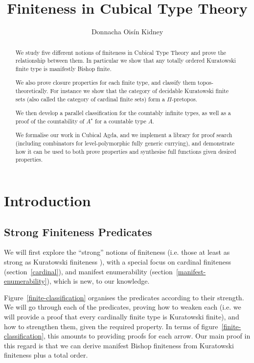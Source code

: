 
\title{Finiteness in Cubical Type Theory}
\author{Donnacha Oisín Kidney}

\maketitle
\begin{abstract}
  We study five different notions of finiteness in Cubical Type Theory and prove
  the relationship between them.
  In particular we show that any totally ordered Kuratowski finite type is
  manifestly Bishop finite.

  We also prove closure properties for each finite type, and classify them
  topos-theoretically.
  For instance we show that the category of decidable Kuratowski finite sets
  (also called the category of cardinal finite sets) form a \(\Pi\)-pretopos.

  We then develop a parallel classification for the countably infinite types, as
  well as a proof of the countability of \(A^\star\) for a countable type \(A\).

  We formalise our work in Cubical Agda, and we implement a library for proof
  search (including combinators for level-polymorphic fully generic currying),
  and demonstrate how it can be used to both prove properties and synthesise
  full functions given desired properties.
\end{abstract}
\section{Introduction}
\subsection{Strong Finiteness Predicates}

We will first explore the ``strong'' notions of finiteness (i.e. those at least
as strong as Kuratowski finiteness \cite{kuratowskiNotionEnsembleFini1920}),
with a special focus on cardinal finiteness (section~\ref{cardinal}), and
manifest enumerability (section~\ref{manifest-enumerability}), which is new, to
our knowledge.

Figure~\ref{finite-classification} organises the predicates according to
their strength.
We will go through each of the predicates, proving how to weaken each (i.e. we
will provide a proof that every cardinally finite type is Kuratowski finite),
and how to strengthen them, given the required property.
In terms of figure~\ref{finite-classification}, this amounts to providing proofs
for each arrow.
Our main proof in this regard is that we can derive manifest Bishop finiteness
from Kuratowski finiteness plus a total order.

